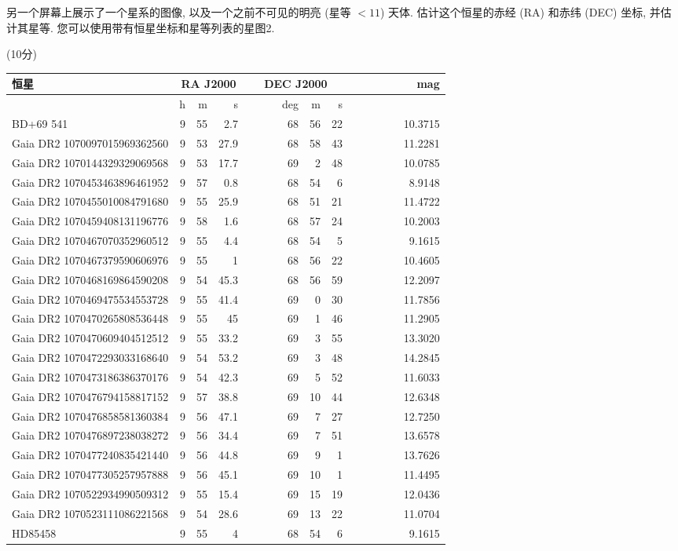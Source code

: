 \documentclass[a4paper,fontset=fandol]{ctexart}
\newcommand{\points}[1]{\par %
	\noindent %
	\hfill (#1分)%
	\vspace{1em}
	}
\begin{document}
	另一个屏幕上展示了一个星系的图像, 以及一个之前不可见的明亮 (星等 $< 11$) 天体. 估计这个恒星的赤经 (RA) 和赤纬 (DEC) 坐标, 并估计其星等. 您可以使用带有恒星坐标和星等列表的星图2. 
	\points{10}
	
	\vspace{0em}
	\begin{table}[!h]
		\centering
		\begin{tabular}{|l|rrr|rrr|r|}
			\hline
			恒星&\multicolumn{3}{|c|}{RA J2000}&\multicolumn{3}{|c|}{DEC J2000}&~~~~~~~~~~mag\\
			\hline
			&h&m&s&~~~~~~deg&m&s&\\
			\hline
			BD+69 541&9&55&2.7&68&56&22&10.3715\\
			Gaia DR2 1070097015969362560 & 9&53 & 27.9 & 68 & 58&43 & 11.2281 \\
			Gaia DR2 1070144329329069568 &9& 53 & 17.7 & 69 &2& 48 &10.0785  \\
			Gaia DR2 1070453463896461952 & 9 & 57 & 0.8 &  68 & 54 &6& 8.9148 \\
			Gaia DR2 1070455010084791680 &9& 55 & 25.9 & 68 & 51&21 & 11.4722 \\
			Gaia DR2 1070459408131196776 & 9 & 58 & 1.6 & 68 & 57 & 24 & 10.2003 \\
			Gaia DR2 1070467070352960512 & 9 & 55 & 4.4 & 68& 54 & 5 & 9.1615 \\
			Gaia DR2 1070467379590606976 & 9 & 55 & 1 & 68&56&22&10.4605 \\
			Gaia DR2 1070468169864590208 & 9 & 54 & 45.3 & 68 &56& 59 & 12.2097 \\
			Gaia DR2 1070469475534553728 & 9 & 55 & 41.4 & 69 & 0 & 30 & 11.7856 \\
			Gaia DR2 1070470265808536448 & 9 & 55 & 45 &69& 1 & 46 & 11.2905 \\
			Gaia DR2 1070470609404512512 & 9 & 55 & 33.2 & 69 & 3 & 55 & 13.3020 \\
			Gaia DR2 1070472293033168640 & 9 & 54 & 53.2 & 69 & 3 & 48 & 14.2845 \\
			Gaia DR2 1070473186386370176 & 9 & 54 & 42.3 & 69 & 5 & 52 & 11.6033 \\
			Gaia DR2 1070476794158817152 &9&57&38.8&69&10& 44  & 12.6348 \\
			Gaia DR2 1070476858581360384 &9& 56 & 47.1 & 69 & 7 & 27& 12.7250 \\
			Gaia DR2 1070476897238038272 & 9 & 56 & 34.4 & 69 & 7 & 51 & 13.6578 \\
			Gaia DR2 1070477240835421440 &9&56&44.8&69&9& 1 & 13.7626 \\
			Gaia DR2 1070477305257957888 & 9 & 56 & 45.1 & 69 & 10& 1 & 11.4495 \\
			Gaia DR2 1070522934990509312 & 9 &55&15.4&69&15&19& 12.0436 \\
			Gaia DR2 1070523111086221568 & 9 & 54&28.6 & 69 & 13 & 22 & 11.0704 \\
			HD85458 & 9& 55&4 & 68 & 54 &6& 9.1615 \\
			\hline
		\end{tabular}
	\end{table}
	
\end{document}
